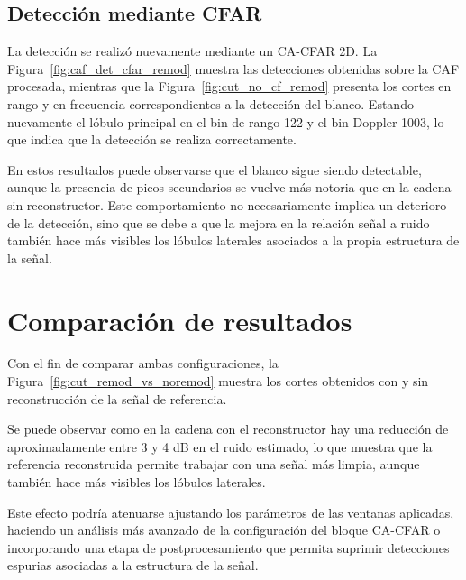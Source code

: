 \subsection{Detección mediante CFAR}



La detección se realizó nuevamente mediante un CA-CFAR 2D. La Figura~\ref{fig:caf_det_cfar_remod} muestra las detecciones obtenidas sobre la CAF procesada, mientras que la Figura~\ref{fig:cut_no_cf_remod} presenta los cortes en rango y en frecuencia correspondientes a la detección del blanco. Estando nuevamente el lóbulo principal en el bin de rango 122 y el bin Doppler 1003, lo que indica que la detección se realiza correctamente.










En estos resultados puede observarse que el blanco sigue siendo detectable, aunque la presencia de picos secundarios se vuelve más notoria que en la cadena sin reconstructor. Este comportamiento no necesariamente implica un deterioro de la detección, sino que se debe a que la mejora en la relación señal a ruido también hace más visibles los lóbulos laterales asociados a la propia estructura de la señal.



\section{Comparación de resultados}



Con el fin de comparar ambas configuraciones, la Figura~\ref{fig:cut_remod_vs_noremod} muestra los cortes obtenidos con y sin reconstrucción de la señal de referencia.






Se puede observar como en la cadena con el reconstructor hay una reducción de aproximadamente entre 3 y 4 dB en el ruido estimado, lo que muestra que la referencia reconstruida permite trabajar con una señal más limpia, aunque también hace más visibles los lóbulos laterales.



Este efecto podría atenuarse ajustando los parámetros de las ventanas aplicadas, haciendo un análisis más avanzado de la configuración del bloque CA-CFAR  o incorporando una etapa de postprocesamiento que permita suprimir detecciones espurias asociadas a la estructura de la señal.
